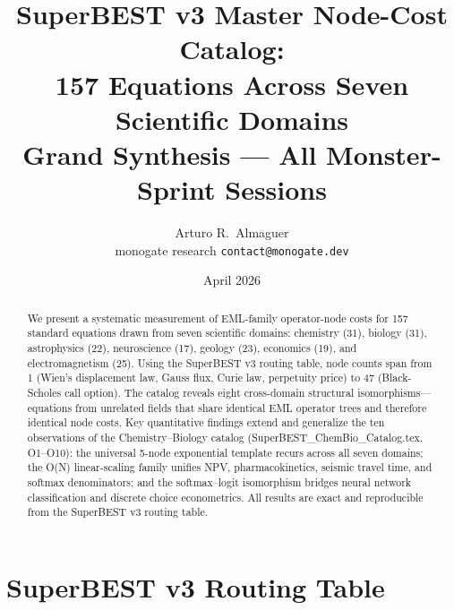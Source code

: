 \documentclass[12pt,a4paper]{article}
\title{SuperBEST v3 Master Node-Cost Catalog:\\
       157 Equations Across Seven Scientific Domains\\[6pt]
       \large Grand Synthesis --- All Monster-Sprint Sessions}
\author{Arturo R.\ Almaguer\\
\small monogate research \quad \texttt{contact@monogate.dev}}
\date{April 2026}
\theoremstyle{definition}
\begin{document}
\maketitle

\begin{abstract}
We present a systematic measurement of EML-family operator-node costs for
157 standard equations drawn from seven scientific domains: chemistry (31),
biology (31), astrophysics (22), neuroscience (17), geology (23),
economics (19), and electromagnetism (25).
Using the SuperBEST v3 routing table, node counts span from 1 (Wien's
displacement law, Gauss flux, Curie law, perpetuity price) to 47
(Black-Scholes call option).
The catalog reveals eight cross-domain structural isomorphisms---equations
from unrelated fields that share identical EML operator trees and therefore
identical node costs.
Key quantitative findings extend and generalize the ten observations of the
Chemistry--Biology catalog (SuperBEST\_ChemBio\_Catalog.tex, O1--O10):
the universal 5-node exponential template recurs across all seven domains;
the O(N) linear-scaling family unifies NPV, pharmacokinetics,
seismic travel time, and softmax denominators; and the softmax--logit
isomorphism bridges neural network classification and discrete choice
econometrics.
All results are exact and reproducible from the SuperBEST v3 routing table.
\end{abstract}

\tableofcontents
\newpage

\section{SuperBEST v3 Routing Table}
\label{sec:routing}
\end{document}
